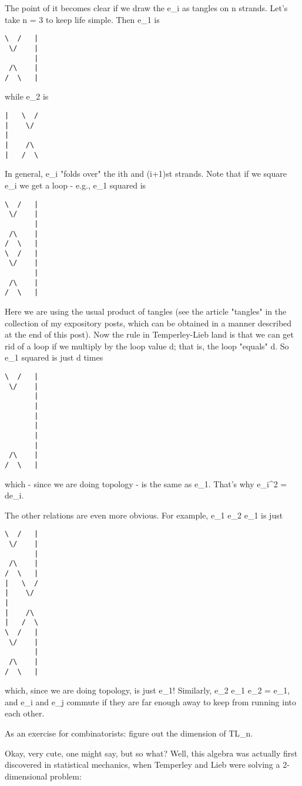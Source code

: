 The point of it becomes clear if we draw the e_i as tangles on n
strands.  Let's take n = 3 to keep life simple.  Then e_1 is

\begin{verbatim}
\  /   |
 \/    |
       |
 /\    |
/  \   |
\end{verbatim}
    

while e_2 is

\begin{verbatim}
|   \  /  
|    \/   
|      
|    /\   
|   /  \  
\end{verbatim}
    

In general, e_i "folds over" the ith and (i+1)st strands.  Note that if
we square e_i we get a loop - e.g., e_1 squared is

\begin{verbatim}
\  /   |
 \/    |
       |
 /\    |
/  \   |
\  /   |
 \/    |
       |
 /\    |
/  \   |
\end{verbatim}
    

Here we are using the usual product of tangles (see the article "tangles"
in the collection of my expository posts, which can be obtained in a
manner described at the end of this post).  Now the rule in
Temperley-Lieb land is that we can get rid of a loop if we multiply by
the loop value d; that is, the loop "equals" d.  So e_1 squared is just
d times


\begin{verbatim}
\  /   |
 \/    |
       |
       |
       |
       |
       |
       |
 /\    |
/  \   |
\end{verbatim}
    

which - since we are doing topology - is the same as e_1.  That's why 
e_i^2 = de_i.  

The other relations are even more obvious.  For example, e_1 e_2 e_1 is
just

\begin{verbatim}
\  /   |
 \/    |
       |
 /\    |
/  \   |
|   \  /  
|    \/   
|      
|    /\   
|   /  \  
\  /   |
 \/    |
       |
 /\    |
/  \   |
\end{verbatim}
    

which, since we are doing topology, is just e_1!  Similarly, e_2 e_1 e_2
= e_1, and e_i and e_j commute if they are far enough away to keep from
running into each other.

As an exercise for combinatorists: figure out the dimension of TL_n.

Okay, very cute, one might say, but so what?  Well, this algebra was
actually first discovered in statistical mechanics, when Temperley and
Lieb were solving a 2-dimensional problem:

